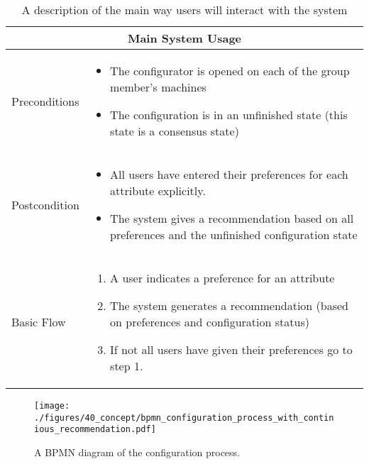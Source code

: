 \begin{table}[htb]
    \begin{center}
        \begin{tabularx}{\columnwidth}{l|X}
            \multicolumn{2}{c}{Main System Usage} \\
            \hline
            Preconditions   & 
                \begin{itemize}
                    \item The configurator is opened on each of the group member's machines
                    \item The configuration is in an unfinished state (this state is a consensus state)
                \end{itemize} \\
            \hline
            Postcondition   & 
                \begin{itemize}
                    \item All users have entered their preferences for each attribute explicitly.
                    \item The system gives a recommendation based on all preferences and the unfinished configuration state
                \end{itemize} \\
            \hline
            Basic Flow      & 
                \begin{enumerate}
                    \item A user indicates a preference for an attribute
                    \item The system generates a recommendation (based on preferences and configuration status)
                    \item If not all users have given their preferences go to step 1.
                \end{enumerate} \\
            \hline
        \end{tabularx}
        \caption[Main System Usage]{A description of the main way users will interact with the system}
        \label{tab:Concept:MainUseCase}
    \end{center}
\end{table}

\begin{figure}[htb]
    \centering
    \texttt{[image: ./figures/40\_concept/bpmn\_configuration\_process\_with\_continious\_recommendation.pdf]}
    \caption[Configuration Process]{A BPMN diagram of the configuration process.}
    \label{fig:Concept:ConfigurationProcess}
\end{figure}

